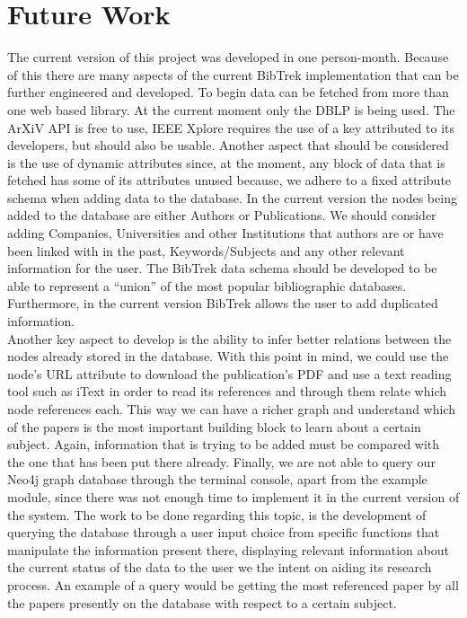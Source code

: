\documentclass[twocolumn]{article}
\begin{document}
\section{Future Work}
The current version of this project was developed in one person-month. Because of this there are many aspects of the current BibTrek implementation that can be further engineered and developed. To begin data can be fetched from more than one web based library. At the current moment only the DBLP is being used. The ArXiV API is free to use, IEEE Xplore requires the use of a key attributed to its developers, but should also be usable. Another aspect that should be considered is the use of dynamic attributes since, at the moment, any block of data that is fetched has some of its attributes unused because, we adhere to a fixed attribute schema when adding data to the database. In the current version the nodes being added to the database are either Authors or Publications. We should consider adding Companies, Universities and other Institutions that authors are or have been linked with in the past, Keywords/Subjects and any other relevant information for the user. The BibTrek data schema should be developed to be able to represent a ``union'' of the most popular bibliographic databases. Furthermore, in the current version BibTrek allows the user to add duplicated information. \\[1\baselineskip]
Another key aspect to develop is the ability to infer better relations between the nodes already stored in the database. With this point in mind, we could use the node's URL attribute to download the publication's PDF and use a text reading tool such as iText in order to read its references and through them relate which node references each. This way we can have a richer graph and understand which of the papers is the most important building block to learn about a certain subject. Again, information that is trying to be added must be compared with the one that has been put there already. Finally, we are not able to query our Neo4j graph database through the terminal console, apart from the example module, since there was not enough time to implement it in the current version of the system. The work to be done regarding this topic, is the development of querying the database through a user input choice from specific functions that manipulate the information present there, displaying relevant information about the current status of the data to the user we the intent on aiding its research process. An example of a query would be getting the most referenced paper by all the papers presently on the database with respect to a certain subject.
\end{document}
